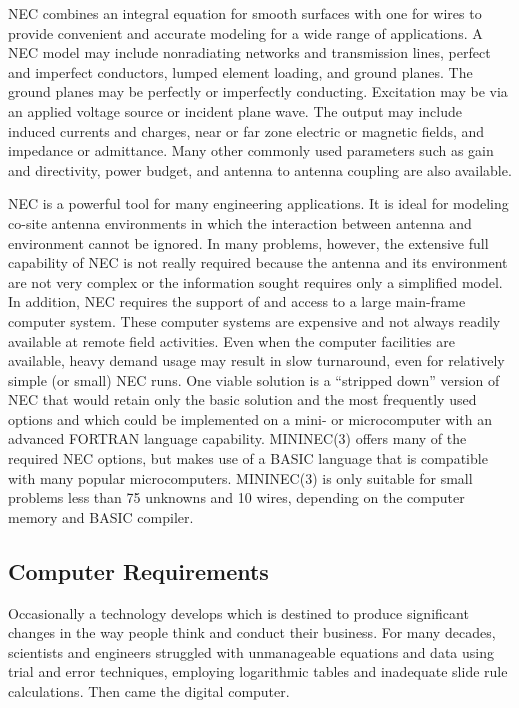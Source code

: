 \documentclass[12pt]{article}
\begin{document}
NEC combines an integral equation for smooth surfaces with one for wires
to provide convenient and accurate modeling for a wide range of
applications. A NEC model may include nonradiating networks and
transmission lines, perfect and imperfect conductors, lumped element
loading, and ground planes. The ground planes may be perfectly or
imperfectly conducting. Excitation may be via an applied voltage source or
incident plane wave. The output may include induced currents and
charges, near or far zone electric or magnetic fields, and impedance or
admittance. Many other commonly used parameters such as gain and
directivity, power budget, and antenna to antenna coupling are also
available.

NEC is a powerful tool for many engineering applications. It is ideal
for modeling co-site antenna environments in which the interaction
between antenna and environment cannot be ignored. In many problems,
however, the extensive full capability of NEC is not really required
because the antenna and its environment are not very complex or the
information sought requires only a simplified model. In addition, NEC
requires the support of and access to a large main-frame computer
system. These computer systems are expensive and not always readily
available at remote field activities. Even when the computer facilities
are available, heavy demand usage may result in slow turnaround, even
for relatively simple (or small) NEC runs. One viable solution is a
``stripped down'' version of NEC that would retain only the basic
solution and the most frequently used options and which could be
implemented on a mini- or microcomputer with an advanced FORTRAN
language capability. MININEC(3) offers many of the required NEC options,
but makes use of a BASIC language that is compatible with many popular
microcomputers. MININEC(3) is only suitable for small problems less than
75 unknowns and 10 wires, depending on the computer memory and BASIC
compiler.

\subsection{Computer Requirements}
Occasionally a technology develops which is destined to produce
significant changes in the way people think and conduct their business.
For many decades, scientists and engineers struggled with unmanageable
equations and data using trial and error techniques, employing
logarithmic tables and inadequate slide rule calculations. Then came the
digital computer.
\end{document}
